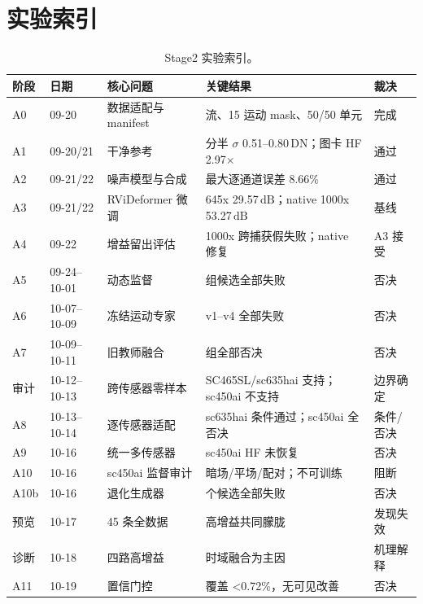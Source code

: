 \documentclass[11pt,a4paper,UTF8,fontset=fandol]{ctexart}
\newcommand{\dn}{\ensuremath{\,\mathrm{DN}}}
\newcommand{\db}{\ensuremath{\,\mathrm{dB}}}
\begin{document}
\appendix
\section{实验索引}

\begin{table}[H]
\centering
\small
\caption{Stage2 实验索引。}
\label{tab:index}
\begin{tabular}{p{}p{}p{}>{\raggedright\arraybackslash}p{}p{}}
\toprule
阶段 & 日期 & 核心问题 & 关键结果 & 裁决 \\
\midrule
A0 & 09-20 & 数据适配与 manifest & 33 流、15 运动 mask、50/50 单元 & 完成 \\
A1 & 09-20/21 & 干净参考 & 分半 $\sigma$ 0.51--0.80\dn；图卡 HF 2.97$\times$ & 通过 \\
A2 & 09-21/22 & 噪声模型与合成 & 最大逐通道误差 8.66\% & 通过 \\
A3 & 09-21/22 & RViDeformer 微调 & 645x 29.57\db；native 1000x 53.27\db & 基线 \\
A4 & 09-22 & 增益留出评估 & 1000x 跨捕获假失败；native 修复 & A3 接受 \\
A5 & 09-24--10-01 & 动态监督 & 9 组候选全部失败 & 否决 \\
A6 & 10-07--10-09 & 冻结运动专家 & v1--v4 全部失败 & 否决 \\
A7 & 10-09--10-11 & 旧教师融合 & 36 组全部否决 & 否决 \\
审计 & 10-12--10-13 & 跨传感器零样本 & SC465SL/sc635hai 支持；sc450ai 不支持 & 边界确定 \\
A8 & 10-13--10-14 & 逐传感器适配 & sc635hai 条件通过；sc450ai 全否决 & 条件/否决 \\
A9 & 10-16 & 统一多传感器 & sc450ai HF 未恢复 & 否决 \\
A10 & 10-16 & sc450ai 监督审计 & 0 暗场/平场/配对；不可训练 & 阻断 \\
A10b & 10-16 & 退化生成器 & 3 个候选全部失败 & 否决 \\
预览 & 10-17 & 45 条全数据 & 高增益共同朦胧 & 发现失效 \\
诊断 & 10-18 & 四路高增益 & 时域融合为主因 & 机理解释 \\
A11 & 10-19 & 置信门控 & 覆盖 <0.72\%，无可见改善 & 否决 \\
\bottomrule
\end{tabular}
\end{table}
\end{document}
